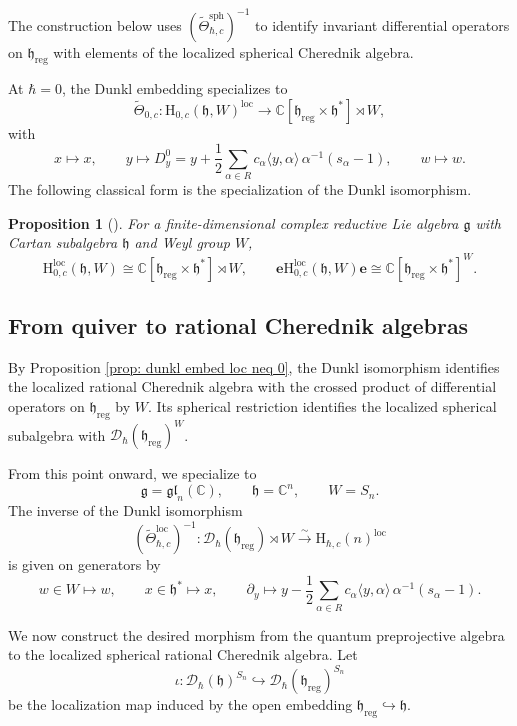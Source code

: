 \documentclass[11pt,reqno]{amsart}
\newtheorem{proposition}[theorem]{Proposition}
\theoremstyle{definition}
\newcommand{\bbC}{\mathbb{C}}
\newcommand{\gl}{\mathfrak{gl}}
\newcommand{\be}{\mathbf{e}}
\newcommand{\tos}{\mapsto}
\newcommand{\mD}{\mathcal{D}}
\newcommand{\fkg}{\mathfrak{g}}
\newcommand{\rmH}{\mathrm{H}}
\newcommand{\fkh}{\mathfrak{h}}
\newcommand{\reg}{\mathrm{reg}}
\newcommand{\sph}{{\mathrm{sph}}}
\newcommand{\loc}{{\mathrm{loc}}}
\begin{document}
The construction below uses \((\widetilde\Theta_{\hbar,c}^{\sph})^{-1}\) to identify invariant differential operators on \(\fkh_{\reg}\) with elements of the localized spherical Cherednik algebra.

At \(\hbar=0\), the Dunkl embedding specializes to
\[
\widetilde\Theta_{0,c}:
\rmH_{0,c}(\fkh,W)^\loc
\longrightarrow
\bbC[\fkh_{\reg}\times\fkh^*]\rtimes W,
\]
with
\[
x\tos x,
\qquad
y\tos D_y^0
=y+\frac12\sum_{\alpha\in R}c_\alpha
\langle y,\alpha\rangle\,\alpha^{-1}(s_\alpha-1),
\qquad
w\tos w.
\]
The following classical form is the specialization of the Dunkl
isomorphism.
\begin{proposition}[{\cite[Proposition~7.9(ii)]{Eti2009Lec}}]
\label{prop: dunkl embed loc 0}
	For a finite-dimensional complex reductive Lie algebra \(\fkg\) with Cartan subalgebra \(\fkh\) and Weyl group \(W\),
	\[
	\rmH^{\loc}_{0,c}(\fkh,W)
	\cong
	\bbC[\fkh_{\reg}\times\fkh^*]\rtimes W,
	\qquad
	\be\rmH^{\loc}_{0,c}(\fkh,W)\be
	\cong
	\bbC[\fkh_{\reg}\times\fkh^*]^W.
	\]
\end{proposition}

\subsection{From quiver to rational Cherednik algebras}

By Proposition \ref{prop: dunkl embed loc neq 0}, the Dunkl isomorphism identifies the localized rational Cherednik algebra with the crossed product of differential operators on \(\fkh_{\reg}\) by \(W\). Its spherical restriction identifies the localized spherical subalgebra with \(\mD_\hbar(\fkh_{\reg})^W\).

From this point onward, we specialize to
	\[
	\fkg=\gl_n(\bbC),
	\qquad
	\fkh=\bbC^n,
	\qquad
	W=S_n.
	\]
The inverse of the  Dunkl isomorphism
\[
(\widetilde{\Theta}^{\loc}_{\hbar,c})^{-1}:
\mD_\hbar(\fkh_{\reg})\rtimes W
\xrightarrow{\sim}
\rmH_{\hbar,c}(n)^\loc
\]
is given on generators by
\begin{equation}\label{for: inverse dunkl in x}
	w\in W\tos w,
	\qquad
	x\in\fkh^*\tos x,
	\qquad
	\partial_y\tos
	y-\frac12\sum_{\alpha\in R}c_\alpha
	\langle y,\alpha\rangle\,\alpha^{-1}(s_\alpha-1).
\end{equation}

We now construct the desired morphism from the quantum preprojective algebra to the localized spherical rational Cherednik algebra. Let
\[
\iota:
\mD_\hbar(\fkh)^{S_n}
\hookrightarrow
\mD_\hbar(\fkh_{\reg})^{S_n}
\]
be the localization map induced by the open embedding
\(\fkh_{\reg}\hookrightarrow\fkh\).
\end{document}
